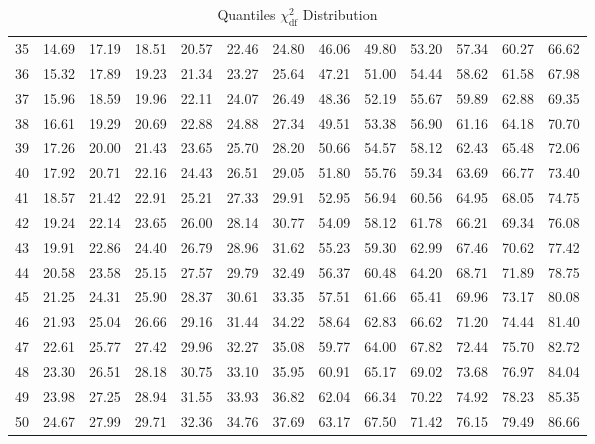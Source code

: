 \documentclass[captions=tableheading, 12pt, headings=small, parskip=half]{scrartcl}
\begin{document}
\begin{table}[ht]
{\begin{tabular}{rd{2.3}d{2.3}d{2.3}d{2.3}d{2.3}d{2.3}d{2.3}d{2.3}d{2.3}d{2.3}d{2.3}d{2.3}}
		35 & 14.69 & 17.19 & 18.51 & 20.57 & 22.46 & 24.80 & 46.06 & 49.80 & 53.20 & 57.34 & 60.27 & 66.62 \\ 
		36 & 15.32 & 17.89 & 19.23 & 21.34 & 23.27 & 25.64 & 47.21 & 51.00 & 54.44 & 58.62 & 61.58 & 67.98 \\ 
		37 & 15.96 & 18.59 & 19.96 & 22.11 & 24.07 & 26.49 & 48.36 & 52.19 & 55.67 & 59.89 & 62.88 & 69.35 \\ 
		38 & 16.61 & 19.29 & 20.69 & 22.88 & 24.88 & 27.34 & 49.51 & 53.38 & 56.90 & 61.16 & 64.18 & 70.70 \\ 
		39 & 17.26 & 20.00 & 21.43 & 23.65 & 25.70 & 28.20 & 50.66 & 54.57 & 58.12 & 62.43 & 65.48 & 72.06 \\ 
		40 & 17.92 & 20.71 & 22.16 & 24.43 & 26.51 & 29.05 & 51.80 & 55.76 & 59.34 & 63.69 & 66.77 & 73.40 \\
		  41 & 18.57 & 21.42 & 22.91 & 25.21 & 27.33 & 29.91 & 52.95 & 56.94 & 60.56 & 64.95 & 68.05 & 74.75 \\ 
		42 & 19.24 & 22.14 & 23.65 & 26.00 & 28.14 & 30.77 & 54.09 & 58.12 & 61.78 & 66.21 & 69.34 & 76.08 \\ 
		43 & 19.91 & 22.86 & 24.40 & 26.79 & 28.96 & 31.62 & 55.23 & 59.30 & 62.99 & 67.46 & 70.62 & 77.42 \\ 
		44 & 20.58 & 23.58 & 25.15 & 27.57 & 29.79 & 32.49 & 56.37 & 60.48 & 64.20 & 68.71 & 71.89 & 78.75 \\ 
		45 & 21.25 & 24.31 & 25.90 & 28.37 & 30.61 & 33.35 & 57.51 & 61.66 & 65.41 & 69.96 & 73.17 & 80.08 \\ 
		46 & 21.93 & 25.04 & 26.66 & 29.16 & 31.44 & 34.22 & 58.64 & 62.83 & 66.62 & 71.20 & 74.44 & 81.40 \\ 
		47 & 22.61 & 25.77 & 27.42 & 29.96 & 32.27 & 35.08 & 59.77 & 64.00 & 67.82 & 72.44 & 75.70 & 82.72 \\ 
		48 & 23.30 & 26.51 & 28.18 & 30.75 & 33.10 & 35.95 & 60.91 & 65.17 & 69.02 & 73.68 & 76.97 & 84.04 \\ 
		49 & 23.98 & 27.25 & 28.94 & 31.55 & 33.93 & 36.82 & 62.04 & 66.34 & 70.22 & 74.92 & 78.23 & 85.35 \\ 
		50 & 24.67 & 27.99 & 29.71 & 32.36 & 34.76 & 37.69 & 63.17 & 67.50 & 71.42 & 76.15 & 79.49 & 86.66 \\ 
		\bottomrule
		\bottomrule
	\end{tabular}}
	\caption{Quantiles $\chi^2_{\text{df}}$ Distribution}
\end{table}
\end{document}
